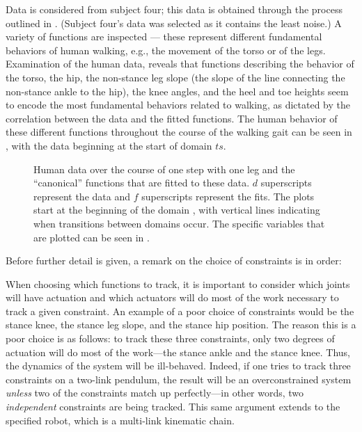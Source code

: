 Data is considered from subject four; this data is obtained through the process outlined in . (Subject four's data was selected as it contains the least noise.) A variety of functions are inspected --- these represent different fundamental behaviors of human walking, e.g., the movement of the torso or of the legs. Examination of the human data, reveals that functions describing the behavior of the torso, the hip, the non-stance leg slope (the slope of the line connecting the non-stance ankle to the hip), the knee angles, and the heel and toe heights seem to encode the most fundamental behaviors related to walking, as dictated by the correlation between the data and the fitted functions. The human behavior of these different functions throughout the course of the walking gait can be seen in , with the data beginning at the start of domain $ts$.

\begin{figure}[t!]
  \centering
  \caption[Human data over the course of one step with one leg]{Human data over the course of one step with one leg and the ``canonical'' functions that are fitted to these data. $d$ superscripts represent the data and $f$ superscripts represent the fits. The plots start at the beginning of the domain {\DA}, with vertical lines indicating when transitions between domains occur. The specific variables that are plotted can be seen in .}
  \label{fig:constraints-fitting}
\end{figure}

Before further detail is given, a remark on the choice of constraints is in order:
\begin{remark} \label{rmk:actuation}
  When choosing which functions to track, it is important to consider which
  joints will have actuation and which actuators will do most of the work
  necessary to track a given constraint.
  An example of a poor choice of constraints would be the stance knee, the
  stance leg slope, and the stance hip position.
  The reason this is a poor choice is as follows:
  to track these three constraints, only two degrees of actuation will do most
  of the work---the stance ankle and the stance knee.
  Thus, the dynamics of the system will be ill-behaved.
  Indeed, if one tries to track three constraints on a two-link pendulum, the
  result will be an overconstrained system {\em unless} two of the constraints
  match up perfectly---in other words, two {\em independent} constraints are
  being tracked.
  This same argument extends to the specified robot, which is a multi-link
  kinematic chain.
\end{remark}

